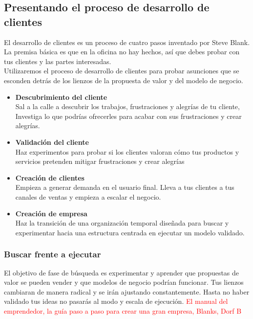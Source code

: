 \documentclass[11pt]{book}
\begin{document}
\subsection{Presentando el proceso de desarrollo de clientes}
El desarrollo de clientes es un proceso de cuatro pasos inventado por Steve Blank.
La premisa básica es que en la oficina no hay hechos, así que debes probar con tus clientes y las partes interesadas.\\
Utilizaremos el proceso de desarrollo de clientes para probar  asunciones que se esconden detrás de los lienzos de la propuesta de valor y del modelo de negocio.
\begin{itemize}
\item \textbf{ Descubrimiento del cliente }\\
Sal a la calle a descubrir los trabajos, frustraciones y alegrías de tu cliente, Investiga lo que podrías ofrecerles para acabar con sus frustraciones y crear alegrías.
\item \textbf{ Validación del cliente }\\
Haz experimentos para probar si los clientes valoran cómo tus productos y servicios pretenden mitigar frustraciones y crear alegrías
\item \textbf{ Creación de clientes }\\
Empieza a generar demanda en el usuario final. Lleva a tus clientes a tus canales de ventas y empieza a escalar el negocio.
\item \textbf{ Creación de empresa }\\
Haz la transición de una organización temporal diseñada para buscar y experimentar hacia una estructura centrada en ejecutar un modelo validado.
\end{itemize}
\subsubsection{Buscar frente a ejecutar}
El objetivo de fase de búsqueda es experimentar y aprender que propuestas de valor se pueden vender y que modelos de negocio podrían funcionar. Tus lienzos cambiaran de manera radical y se irán ajustando constantemente. Hasta no haber validado tus ideas no pasarás al modo y escala de ejecución.
\textcolor{red}{El manual del emprendedor, la guía paso a paso para crear una gran empresa, Blanks, Dorf B}
\end{document}
